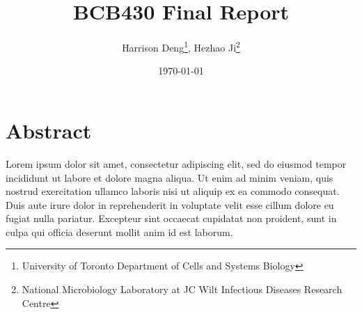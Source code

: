 \documentclass[11pt, letterpaper]{article}
\title{BCB430 Final Report}
\author{Harrison Deng\thanks{University of Toronto Department of Cells and Systems Biology}, Hezhao Ji\thanks{National Microbiology Laboratory at JC Wilt Infectious Diseases Research Centre}}
\date{\today}
\begin{document}
\maketitle

\section{Abstract}
Lorem ipsum dolor sit amet, consectetur adipiscing elit, sed do eiusmod tempor incididunt ut labore et dolore magna aliqua. Ut enim ad minim veniam, quis nostrud exercitation ullamco laboris nisi ut aliquip ex ea commodo consequat. Duis aute irure dolor in reprehenderit in voluptate velit esse cillum dolore eu fugiat nulla pariatur. Excepteur sint occaecat cupidatat non proident, sunt in culpa qui officia deserunt mollit anim id est laborum.




\end{document}
